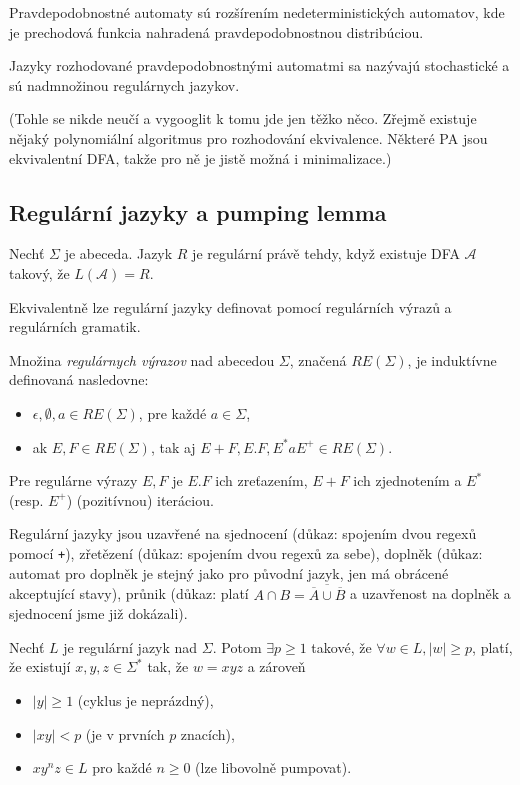 Pravdepodobnostné automaty sú rozšírením nedeterministických
automatov, kde je prechodová funkcia nahradená pravdepodobnostnou
distribúciou.

Jazyky rozhodované pravdepodobnostnými automatmi sa nazývajú stochastické
a sú nadmnožinou regulárnych jazykov.


(Tohle se nikde neučí a vygooglit k tomu jde jen těžko něco. Zřejmě
existuje nějaký polynomiální algoritmus pro rozhodování ekvivalence.
Některé PA jsou ekvivalentní DFA, takže pro ně je jistě možná i
minimalizace.)

\subsection{Regulární jazyky a pumping lemma}

\begin{definition}
Nechť $\Sigma$ je abeceda. Jazyk $R$ je regulární právě tehdy, když
existuje DFA $\mathcal{A}$ takový, že $L(\mathcal{A}) = R$.
\end{definition}

Ekvivalentně lze regulární jazyky definovat pomocí regulárních výrazů a
regulárních gramatik.

\begin{definition}
	Množina {\em regulárnych výrazov} nad abecedou $\Sigma$,
	značená $RE(\Sigma)$, je induktívne definovaná nasledovne:
	\begin{itemize}
		\item $\epsilon, \emptyset, a \in RE(\Sigma)$, pre každé $a \in \Sigma$,
		\item ak $E,F \in RE(\Sigma)$, tak aj $E+F, E.F, E^* a E^+ \in RE(\Sigma)$.
	\end{itemize}
\end{definition}

Pre regulárne výrazy $E,F$ je $E.F$ ich zreťazením, $E+F$ ich zjednotením a 
$E^*$ (resp. $E^+$) (pozitívnou) iteráciou.


Regulární jazyky jsou uzavřené na sjednocení (důkaz: spojením
dvou regexů pomocí \verb|+|), zřetězení (důkaz: spojením dvou
regexů za sebe), doplněk (důkaz: automat pro doplněk je stejný
jako pro původní jazyk, jen má obrácené akceptující stavy), průnik
(důkaz: platí $A \cap B = \overline{\overline{A} \cup \overline{B}}$ a
uzavřenost na doplněk a sjednocení jsme již dokázali).

\begin{theorem}
Nechť $L$ je regulární jazyk nad $\Sigma$.
Potom
$\exists p \geq 1$ takové,
že $\forall w \in L, \lvert w \rvert \geq p$,
platí, že existují $x,y,z \in \Sigma^*$ tak, že $w = xyz$ a zároveň

\begin{itemize}
    \item $\lvert y \rvert \geq 1$ (cyklus je neprázdný),
    \item $\lvert xy \rvert < p$ (je v prvních $p$ znacích),
    \item $xy^nz \in L$ pro každé $n \geq 0$ (lze libovolně pumpovat).
\end{itemize}
\end{theorem}

